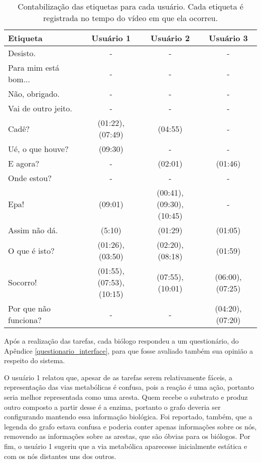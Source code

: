 \begin{table}[h!]
  \centering
  \caption{Contabilização das etiquetas para cada usuário. Cada etiqueta é registrada no tempo do vídeo em que ela ocorreu.}
  \label{tabela_de_etiquetas}
  \begin{tabular}{|l|c|c|c|}
  \hline
  {\cellcolor[HTML]{DFDFDF}Etiqueta} & {\cellcolor[HTML]{DFDFDF}Usuário 1} & {\cellcolor[HTML]{DFDFDF}Usuário 2} & {\cellcolor[HTML]{DFDFDF}Usuário 3} \\ \hline
  Desisto. & - & - & - \\ \hline
  Para mim está bom... & - & - & - \\ \hline
  Não, obrigado. & - & - & - \\ \hline
  Vai de outro jeito. & - & - & - \\ \hline
  Cadê? & (01:22), (07:49) & (04:55) & - \\ \hline
  Ué, o que houve? & (09:30) & - & - \\ \hline
  E agora? & - & (02:01) & (01:46) \\ \hline
  Onde estou? & - & - & - \\ \hline
  Epa! & (09:01) & \specialcell{(00:41), (09:30),\\(10:45)} & - \\ \hline
  Assim não dá. & (5:10) & (01:29) & (01:05) \\ \hline
  O que é isto? & (01:26), (03:50) & (02:20), (08:18) & (01:59) \\ \hline
  Socorro! & \specialcell{(01:55), (07:53),\\(10:15)} & (07:55), (10:01) & (06:00), (07:25) \\ \hline
  Por que não funciona? & - & - & (04:20), (07:20) \\ \hline
  \end{tabular}
\end{table}

\indent Após a realização das tarefas, cada biólogo respondeu a um questionário, do Apêndice \ref{questionario_interface}, para que fosse avaliado também sua opinião a respeito do sistema.

\indent O usuário 1 relatou que, apesar de as tarefas serem relativamente fáceis, a representação das vias metabólicas é confusa, pois a reação é uma ação, portanto seria melhor representada como uma aresta. Quem recebe o substrato e produz outro composto a partir desse é a enzima, portanto o grafo deveria ser configurando mantendo essa informação biológica. Foi reportado, também, que a legenda do grafo estava confusa e poderia conter apenas informações sobre os nós, removendo as informações sobre as arestas, que são óbvias para os biólogos. Por fim, o usuário 1 sugeriu que a via metabólica aparecesse inicialmente estática e com os nós distantes uns dos outros.

